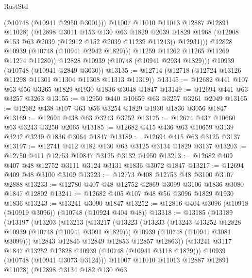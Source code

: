 \begin{lexlean}{RustStd}
\begin{coremodule}
{\begin{coremodule}
{{{{{                    (@10748 (@10941 @2950 @3001)))
                  @11007
                  @11010
                  @11013
                  @12887
                  @12891
                  @11028)
                (@12898
                  @3011
                  @153
                  @130
                  @63
                  @1829
                  @2039
                  @1829
                  @1968
                  (@12908 @153 @63 @2039 (@12912 @152 @2039 @11239 @11243))
                  @12931)))
            @12828
            @10939
            (@10748 (@10941 @2942 @1829)))
          @11259
          @11262
          @11265
          @11269
          @11274
          @11280))
      @12828
      @10939
      (@10748 (@10941 @2934 @1829)))
    @10939
    (@10748 (@10941 @2849 @3030))
@13135 := @12714 (@12718 (@12724 @13126 @11298 @11301 @11304 @11308 @11313 @11319))
@13145 := @12682 @441 @107 @63 @56 @3265 @1829 @1930 @1836 @3048 @1847
@13149 := @12694 @441 @63 @3257 @3263
@13155 := @12950 @440 @10659 @63 @3257 @3261 @2049
@13165 := @12682 @438 @107 @63 @56 @3254 @1829 @1930 @1836 @3056 @1847
@13169 := @12694 @438 @63 @3243 @3252
@13175 := @12674 @437 @10660 @63 @3243 @3250 @2065
@13185 := @12682 @415 @436 @63 @10659 @3139 @3242 @3249 @1836 @3064 @1847
@13189 := @12694 @415 @63 @3125 @3137
@13197 := @12741 @412 @182 @130 @63 @3125 @3134 @1829 @3137
@13203 := @12750 @411 @12753 @10847 @3125 @3132 @1950
@13213 := @12682 @409 @407 @48 @12752 @3111 @3124 @3131 @1836 @3072 @1847
@13217 := @12694 @409 @48 @3100 @3109
@13223 := @12773 @408 @12753 @48 @3100 @3107 @2888
@13233 := @12780 @407 @48 @12752 @2869 @3099 @3106 @1836 @3080 @1847 @12802
@13241 := @12682 @405 @107 @48 @56 @3096 @1829 @1930 @1836
@13243 := @13241 @3090 @1847
@13252 := @12816 @404 @3096 (@10918 (@10919 @3096)) (@10748 (@10924 @404 @48))
@13318 := @13185
    (@13189
      (@13197
        (@13203
          (@13213
            (@13217
              (@13223
                (@13233
                  (@13243 @13252 @12828 @10939 (@10748 (@10941 @3091 @1829)))
                  @10939
                  (@10748 (@10941 @3081 @3099)))
                @12843
                @12846
                @12849
                @12853
                @12857
                @12863))
            (@13241 @3117 @1847 @13252 @12828 @10939 (@10748 (@10941 @3118 @1829)))
            @10939
            (@10748 (@10941 @3073 @3124)))
          @11007
          @11010
          @11013
          @12887
          @12891
          @11028)
        (@12898
          @3134
          @182
          @130
          @63
}}}}}
\end{coremodule}}
\end{coremodule}
\end{lexlean}
